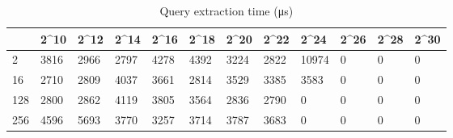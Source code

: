 \begin{table}
\caption{Query extraction time (μs)}
\label{tab:query_extraction_time}
\begin{tabular}{llllllllllll}
\toprule
 & 2^{10} & 2^{12} & 2^{14} & 2^{16} & 2^{18} & 2^{20} & 2^{22} & 2^{24} & 2^{26} & 2^{28} & 2^{30} \\
\midrule
2 & 3816 & 2966 & 2797 & 4278 & 4392 & 3224 & 2822 & 10974 & 0 & 0 & 0 \\
16 & 2710 & 2809 & 4037 & 3661 & 2814 & 3529 & 3385 & 3583 & 0 & 0 & 0 \\
128 & 2800 & 2862 & 4119 & 3805 & 3564 & 2836 & 2790 & 0 & 0 & 0 & 0 \\
256 & 4596 & 5693 & 3770 & 3257 & 3714 & 3787 & 3683 & 0 & 0 & 0 & 0 \\
\bottomrule
\end{tabular}
\end{table}
